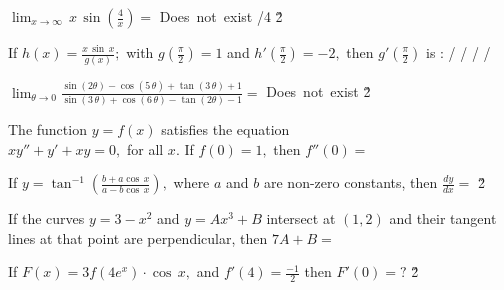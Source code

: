 \documentclass[amsfonts,bezier,leqno,fleqn,12pt,a4paper]{article}
\begin{document}
{{{{\begin{large}
\item %
$\displaystyle \lim_{x\rightarrow\infty} \,x\,\sin\left(\frac{4}{x}\right)=$
\sc
{}
\ee
\be
\mbox{Does not exist}
\ee
{}/4
\ee
{}
\ee
{}
\ee
\v2



\item %
If $\displaystyle h(x)=\frac{x\,\sin\,x}{g(x)};$ with $g\left(\displaystyle\frac{\pi}{2}\right)=1$ and $h'\left(\displaystyle\frac{\pi}{2}\right)=-2,$ then $g'\left(\displaystyle \frac{\pi}{2}\right)$ is :
\sc
{}/\pi
\ee
{}/\pi
\ee
{}
\ee
{}/\pi
\ee
{}/\pi
\ee

\newpage



\item %
$\displaystyle \lim_{\theta\rightarrow 0} \frac{\sin(2\theta)-\cos(5\,\theta)+\tan(3\,\theta)+1}{\sin(3\,\theta)+\cos(6\,\theta)-\tan(2\theta)-1}=$
\sc
{}
\ee
\be
\mbox{Does not exist}
\ee
{}
\ee
{}
\ee
{}
\ee
\v2



\item %
The function $y=f(x)$ satisfies the equation\\ $xy''+y'+xy=0,$ for all $x$. If $f(0)=1,$ then $f''(0)=$
\sc
\be
\displaystyle {}
\ee
{}
\ee
{}
\ee
\be
\displaystyle {}
\ee
\be
\displaystyle {}
\ee

\newpage



\item %
If $\displaystyle y=\tan^{-1} \left(\frac{b+a\cos\,x}{a-b\cos\,x}\right),$ where $a$ and $b$ are non-zero constants, then $\displaystyle \frac{dy}{dx}=$
\sc
\be
\displaystyle {}
\ee
\be
\displaystyle {}
\ee
\be
\displaystyle {}
\ee
\be
{}
\ee
\be
\displaystyle {}
\ee
\v2



\item %
If the curves $y=3-x^2$ and $y=Ax^3+B$ intersect at $(1,2)$ and their tangent lines at that point are perpendicular, then $7A+B=$
\sc
{}
\ee
{}
\ee
{}
\ee
{}
\ee
{}
\ee

\newpage



\item %
If $F(x)=3f(4e^{x})\cdot\cos\,x,$ and $\displaystyle f'(4)=\frac{-1}{2}$ then $F'(0)=?$
\sc
{}
\ee
{}
\ee
{}
\ee
{}
\ee
{}
\ee
\v2




\end{large}}}}}
\end{document}
